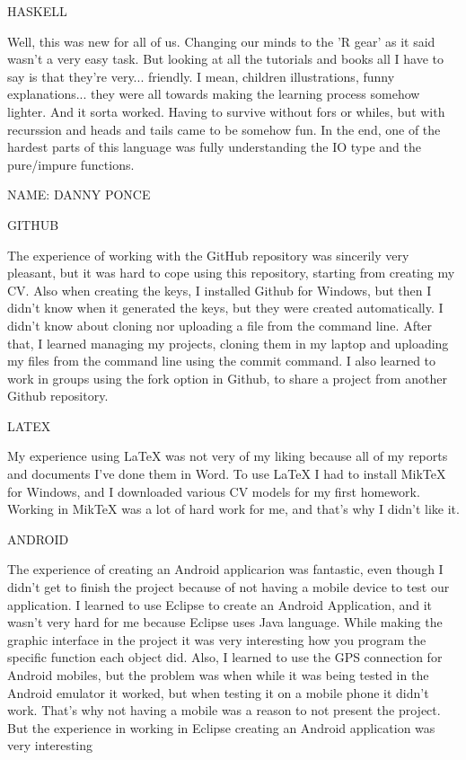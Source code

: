 HASKELL

Well, this was new for all of us. Changing our minds to the 'R gear' as it said wasn't a very easy task. But looking at all the tutorials and books all I have to say is that they're very... friendly. I mean, children illustrations, funny explanations... they were all towards making the learning process somehow lighter. And it sorta worked.
Having to survive without fors or whiles, but with recurssion and heads and tails came to be somehow fun.
In the end, one of the hardest parts of this language was fully understanding the IO type and the pure/impure functions.



NAME:         DANNY PONCE


GITHUB

The experience of working with the GitHub repository was sincerily very pleasant, but it was hard to cope using this repository, starting from creating my CV. Also when creating the keys, I installed Github for Windows, but then I didn't know when it generated the keys, but they were created automatically. I didn't know about cloning nor uploading a file from the command line. After that, I learned managing my projects, cloning them in my laptop and uploading my files from the command line using the commit command. I also learned to work in groups using the fork option in Github, to share a project from another Github repository.


LATEX

My experience using LaTeX was not very of my liking because all of my reports and documents I've done them in Word. To use LaTeX I had to install MikTeX for Windows, and I downloaded various CV models for my first homework. Working in MikTeX was a lot of hard work for me, and that's why I didn't like it.


ANDROID

The experience of creating an Android applicarion was fantastic, even though I didn't get to finish the project because of not having a mobile device to test our application. I learned to use Eclipse to create an Android Application, and it wasn't very hard for me because Eclipse uses Java language. While making the graphic interface in the project it was very interesting how you program the specific function each object did. Also, I learned to use the GPS connection for Android mobiles, but the problem was when while it was being tested in the Android emulator it worked, but when testing it on a mobile phone it didn't work. That's why not having a mobile was a reason to not present the project. But the experience in working in Eclipse creating an Android application was very interesting


